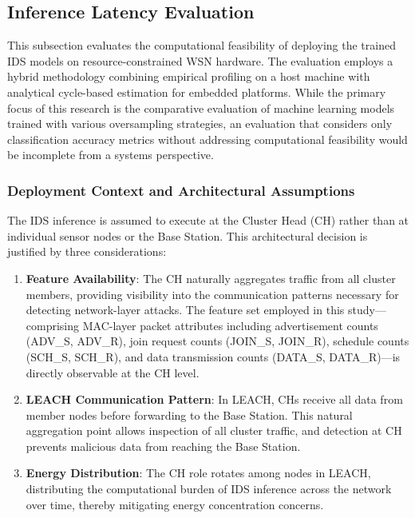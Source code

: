 

\subsection{Inference Latency Evaluation}

This subsection evaluates the computational feasibility of deploying the trained IDS models on resource-constrained WSN hardware. The evaluation employs a hybrid methodology combining empirical profiling on a host machine with analytical cycle-based estimation for embedded platforms. While the primary focus of this research is the comparative evaluation of machine learning models trained with various oversampling strategies, an evaluation that considers only classification accuracy metrics without addressing computational feasibility would be incomplete from a systems perspective.

\subsubsection{Deployment Context and Architectural Assumptions}

The IDS inference is assumed to execute at the Cluster Head (CH) rather than at individual sensor nodes or the Base Station. This architectural decision is justified by three considerations:

\begin{enumerate}
    \item \textbf{Feature Availability}: The CH naturally aggregates traffic from all cluster members, providing visibility into the communication patterns necessary for detecting network-layer attacks. The feature set employed in this study---comprising MAC-layer packet attributes including advertisement counts (ADV\_S, ADV\_R), join request counts (JOIN\_S, JOIN\_R), schedule counts (SCH\_S, SCH\_R), and data transmission counts (DATA\_S, DATA\_R)---is directly observable at the CH level.
    
    \item \textbf{LEACH Communication Pattern}: In LEACH, CHs receive all data from member nodes before forwarding to the Base Station. This natural aggregation point allows inspection of all cluster traffic, and detection at CH prevents malicious data from reaching the Base Station.
    
    \item \textbf{Energy Distribution}: The CH role rotates among nodes in LEACH, distributing the computational burden of IDS inference across the network over time, thereby mitigating energy concentration concerns.
\end{enumerate}

